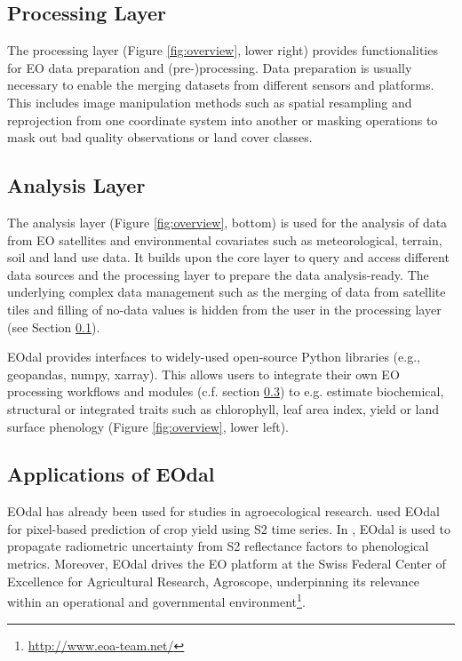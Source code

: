 \subsection{Processing Layer}
\label{subsec:processing-layer}
The processing layer (Figure \ref{fig:overview}, lower right) provides functionalities for \gls{EO} data preparation and (pre-)processing. Data preparation is usually necessary to enable the merging datasets from different sensors and platforms. This includes image manipulation methods such as spatial resampling and reprojection from one coordinate system into another or masking operations to mask out bad quality observations or land cover classes.

\subsection{Analysis Layer}
The analysis layer (Figure \ref{fig:overview}, bottom) is used for the analysis of data from \gls{EO} satellites and environmental covariates such as meteorological, terrain, soil and land use data. It builds upon the core layer to query and access different data sources and the processing layer to prepare the data analysis-ready. The underlying complex data management such as the merging of data from satellite tiles and filling of no-data values is hidden from the user in the processing layer (see Section \ref{subsec:processing-layer}).

\gls{EOdal} provides interfaces to widely-used open-source Python libraries (e.g., geopandas, numpy, xarray). This allows users to integrate their own \gls{EO} processing workflows and modules (c.f. section \ref{subsec:supplementary-modules}) to e.g. estimate biochemical, structural or integrated traits such as chlorophyll, leaf area index, yield or land surface phenology (Figure \ref{fig:overview}, lower left). 

\subsection{Applications of EOdal}
\label{subsec:supplementary-modules}
\gls{EOdal} has already been used for studies in agroecological research. \citet{perich_pixel-based_2022} used \gls{EOdal} for pixel-based prediction of crop yield using S2 time series.  In \citet{graf_propagating_2022}, \gls{EOdal} is used to propagate radiometric uncertainty from \gls{S2} reflectance factors to phenological metrics. Moreover, \gls{EOdal} drives the \gls{EO} platform at the Swiss Federal Center of Excellence for Agricultural Research, Agroscope, underpinning its relevance within an operational and governmental environment\footnote{\url{http://www.eoa-team.net/}}.

